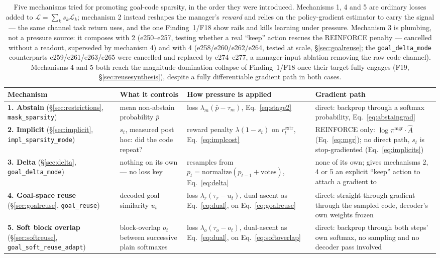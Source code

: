 \documentclass[10pt]{article}
\begin{document}
\begin{table}[h]
\centering\small
\begin{tabular}{p{2.9cm}p{2.7cm}p{4.1cm}p{3.2cm}}
\toprule
Mechanism & What it controls & How pressure is applied & Gradient path \\
\midrule
\textbf{1. Abstain}
(\S\ref{sec:restrictions}, \texttt{mask\_sparsity}) &
mean non-abstain probability $\bar p$ &
loss $\lambda_m(\bar p - \tau_m)$, Eq.~\eqref{eq:stage2} &
direct: backprop through a softmax probability, Eq.~\eqref{eq:abstaingrad} \\
\addlinespace
\textbf{2. Implicit}
(\S\ref{sec:implicit}, \texttt{impl\_sparsity\_mode}) &
$s_t$, measured post hoc: did the code repeat? &
reward penalty $\lambda(1-s_t)$ on $r^{\text{extr}}_t$, Eq.~\eqref{eq:implcost} &
REINFORCE only: $\log\pi^{\text{mgr}}\!\cdot\hat A$ (Eq.~\ref{eq:mgr}); no direct path, $s_t$ is stop-gradiented (Eq.~\ref{eq:implicits}) \\
\addlinespace
\textbf{3. Delta}
(\S\ref{sec:delta}, \texttt{goal\_delta\_mode}) &
nothing on its own --- no loss key &
resamples from $p_t = \mathrm{normalize}(p_{t-1} + \text{votes})$, Eq.~\eqref{eq:delta} &
none of its own; gives mechanisms 2, 4 or 5 an explicit ``keep'' action to attach a gradient to \\
\addlinespace
\textbf{4. Goal-space reuse}
(\S\ref{sec:goalreuse}, \texttt{goal\_reuse}) &
decoded-goal similarity $u_t$ &
loss $\lambda_r(\tau_r - u_t)$, dual-ascent as Eq.~\eqref{eq:dual}, on Eq.~\eqref{eq:goalreuse} &
direct: straight-through gradient through the sampled code, decoder's own weights frozen \\
\addlinespace
\textbf{5. Soft block overlap}
(\S\ref{sec:softreuse}, \texttt{goal\_soft\_reuse\_adapt}) &
block-overlap $o_t$ between successive plain softmaxes &
loss $\lambda_o(\tau_o - o_t)$, dual-ascent as Eq.~\eqref{eq:dual}, on Eq.~\eqref{eq:softoverlap} &
direct: backprop through both steps' own softmax, no sampling and no decoder pass involved \\
\bottomrule
\end{tabular}
\caption{Five mechanisms tried for promoting goal-code sparsity, in the
order they were introduced. Mechanisms 1, 4 and 5 are ordinary losses added
to $\mathcal{L} = \sum_k s_k\mathcal{L}_k$; mechanism 2 instead reshapes the
manager's \emph{reward} and relies on the policy-gradient estimator to carry
the signal --- the same channel task return uses, and the one Finding~1/F18
show rails and kills learning under pressure. Mechanism 3 is plumbing, not a
pressure source: it composes with 2 (e250--e257, testing whether a real
``keep'' action rescues the REINFORCE penalty --- cancelled without a
readout, superseded by mechanism 4) and with 4 (e258/e260/e262/e264,
tested at scale, \S\ref{sec:goalreuse}; the \texttt{goal\_delta\_mode}
counterparts e259/e261/e263/e265 were cancelled and replaced by e274--e277,
a manager-input ablation removing the raw code channel). Mechanisms 4 and 5
both reach the magnitude-domination collapse of Finding~1/F18 once their
target fully engages (F19, \S\ref{sec:reusesynthesis}), despite a fully
differentiable gradient path in both cases.}
\label{tab:foursparsity}
\end{table}
\end{document}
